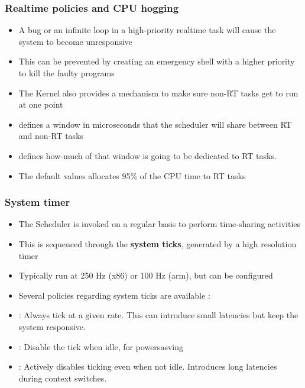 \begin{frame}
	\frametitle{Realtime policies and CPU hogging}
	\begin{itemize}
		\item A bug or an infinite loop in a high-priority realtime task will cause the system to become unresponsive
		\item This can be prevented by creating an emergency shell with a higher priority to kill the faulty programs
		\item The Kernel also provides a mechanism to make sure non-RT tasks get to run at one point
		\item {} defines a window in microseconds that the scheduler will share between RT and non-RT tasks
		\item {} defines how-much of that window is going to be dedicated to RT tasks.
		\item The default values allocates 95\% of the CPU time to RT tasks
	\end{itemize}
\end{frame}

\begin{frame}
	\frametitle{System timer}
	\begin{itemize}
		\item The Scheduler is invoked on a regular basis to perform time-sharing activities
		\item This is sequenced through the \textbf{system ticks}, generated by a high resolution timer
		\item Typically run at 250 Hz (x86) or 100 Hz (arm), but can be configured
		\item Several policies regarding system ticks are available :
		\item {} : Always tick at a given rate. This can introduce small latencies but keep the system responsive.
		\item {} : Disable the tick when idle, for powersasving
		\item {} : Actively disables ticking even when not idle. Introduces long latencies during context switches.
	\end{itemize}
\end{frame}


